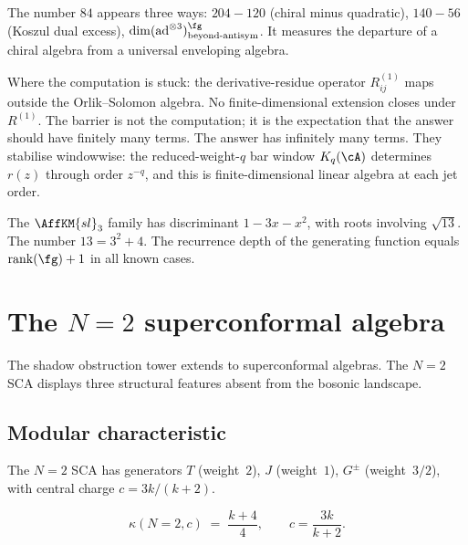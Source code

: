 The number $84$ appears three ways:
$204 - 120$ (chiral minus quadratic),
$140 - 56$ (Koszul dual excess),
$\dim(\mathrm{ad}^{\otimes 3})^{\fg}_{\text{beyond-antisym}}$.
It measures the departure of a chiral algebra from a
universal enveloping algebra.

Where the computation is stuck: the derivative-residue operator
$R^{(1)}_{ij}$ maps outside the Orlik--Solomon algebra. No
finite-dimensional extension closes under $R^{(1)}$. The barrier
is not the computation; it is the expectation that the answer
should have finitely many terms. The answer has infinitely many
terms. They stabilise windowwise: the reduced-weight-$q$ bar
window $K_q(\cA)$ determines $r(z)$ through order $z^{-q}$,
and this is finite-dimensional linear algebra at each jet order.

\begin{remark}
\label{rem:comp-sl3-discriminant}
The $\AffKM{sl}_3$ family has discriminant $1 - 3x - x^2$,
with roots involving $\sqrt{13}$. The number $13 = 3^2 + 4$.
The recurrence depth of the generating function equals
$\operatorname{rank}(\fg) + 1$ in all known cases.
\end{remark}


\section{The $N{=}2$ superconformal algebra}
\label{sec:comp-n2}

The shadow obstruction tower extends to superconformal algebras.
The $N{=}2$ SCA displays three structural features absent from
the bosonic landscape.


\subsection{Modular characteristic}
\label{subsec:comp-n2-kappa}

The $N{=}2$ SCA has generators $T$ (weight~$2$),
$J$ (weight~$1$), $G^\pm$ (weight~$3/2$), with central charge
$c = 3k/(k+2)$.

\begin{proposition}
\label{prop:comp-n2-kappa}
\ClaimStatusProvedHere
\begin{equation}\label{eq:comp-n2-kappa}
 \kappa(N{=}2, c)
 \;=\; \frac{k+4}{4},
 \qquad c = \frac{3k}{k+2}.
\end{equation}
\end{proposition}

